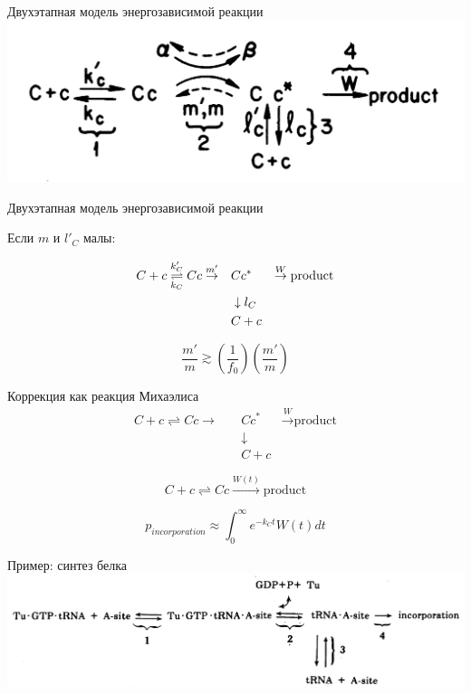 \documentclass{beamer}
\begin{document}
\begin{frame}{Двухэтапная модель энергозависимой реакции}
    \centering \includegraphics[width=\textwidth]{reaction8}
\end{frame}

\begin{frame}{Двухэтапная модель энергозависимой реакции} %

Если $ m $ и $ l'_C $ малы:

\begin{align*}
    C + c \overunderset{k'_C}{k_C}{\rightleftharpoons} Cc \overset{m'}{\rightarrow} \quad & Cc^* & \overset{W}\to \text{product} \\
    & \downarrow l_C & \\
    & C+c &
\end{align*}

\[ \frac{m'}{m} \gtrsim \left( \frac{1}{f_0} \right) \left( \frac{m'}{m} \right) \]

\end{frame}

\begin{frame}{Коррекция как реакция Михаэлиса}
	\begin{align*}
		C + c \rightleftharpoons Cc \rightarrow \quad & Cc^* & \overset{W}\to \text{product} \\
		& \downarrow & \\
		& C+c &
	\end{align*}

	
	\[ C + c \rightleftharpoons Cc \overset{W(t)}\to \text{product} \]
	
	\[ p_{incorporation} \approx \int_{0}^{\infty} e^{-k_C t} W(t) dt \]
\end{frame}

\begin{frame}{Пример: синтез белка }
\centering \includegraphics[width=\textwidth]{reaction_rna2protein}

\end{frame}
\end{document}
